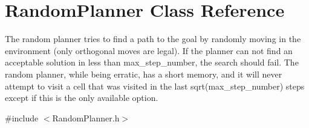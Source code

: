\hypertarget{classRandomPlanner}{}\section{Random\+Planner Class Reference}
\label{classRandomPlanner}


The random planner tries to find a path to the goal by randomly moving in the environment (only orthogonal moves are legal). If the planner can not find an acceptable solution in less than max\+\_\+step\+\_\+number, the search should fail. The random planner, while being erratic, has a short memory, and it will never attempt to visit a cell that was visited in the last sqrt(max\+\_\+step\+\_\+number) steps except if this is the only available option.  




{\ttfamily \#include $<$Random\+Planner.\+h$>$}

